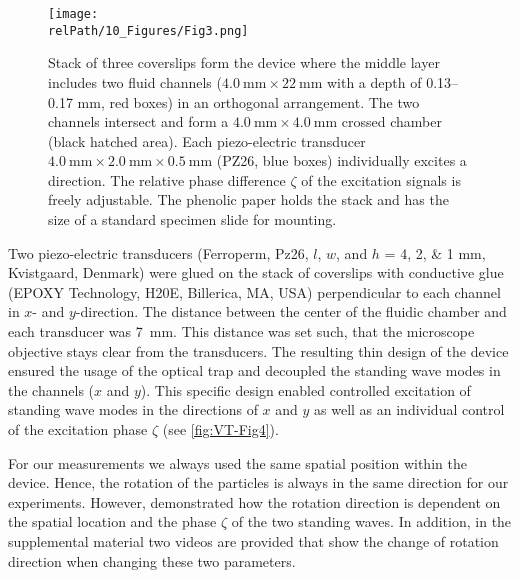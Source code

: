 \begin{figure}
    \centering
    \texttt{[image: \\relPath/10\_Figures/Fig3.png]}
    \caption{Stack of three coverslips form the device where the middle layer 
        includes two fluid channels ($\SI{4.0}{\mm}\times\SI{22}{\mm}$ with a 
        depth of \numrange{0.13}{0.17} \si{\milli\meter}, red boxes) in an 
        orthogonal arrangement. The two channels intersect and form a 
        $\SI{4.0}{\mm}\times\SI{4.0}{\mm}$ crossed chamber (black hatched 
        area).  Each piezo-electric transducer 
        $\SI{4.0}{\mm}\times\SI{2.0}{\mm}\times\SI{0.5}{\mm}$ (PZ26, blue 
        boxes) individually excites a direction.  The relative phase difference 
        $\zeta$ of the excitation signals is freely adjustable.  The phenolic 
        paper holds the stack and has the size of a standard specimen slide for 
    mounting.\label{fig:VT-Fig3}}
\end{figure}

Two piezo-electric transducers (Ferroperm, Pz26, $l$, $w$, and $h$ = \numlist{4; 
2; 1} \si{\mm}, Kvistgaard, Denmark) were glued on the stack of coverslips with 
conductive glue (EPOXY Technology, H20E, Billerica, MA, USA) perpendicular to 
each channel in $x$- and $y$-direction. The distance between the center of the 
fluidic chamber and each transducer was \SI{7}{\mm}. This distance was set such, 
that the microscope objective stays clear from the transducers. The resulting 
thin design of the device ensured the usage of the optical trap and decoupled 
the standing wave modes in the channels ($x$ and $y$). This specific design 
enabled controlled excitation of standing wave modes in the directions of $x$ 
and $y$ as well as an individual control of the excitation phase $\zeta$ (see 
\cref{fig:VT-Fig4}).

For our measurements we always used the same spatial position within the device.  
Hence, the rotation of the particles is always in the same direction for our 
experiments. However, \citeauthor{Lamprecht2015} \cite{Lamprecht2015} 
demonstrated how the rotation direction is dependent on the spatial location and 
the phase $\zeta$ of the two standing waves. In addition, in the supplemental 
material \cite{VT_supplemental} two videos are provided that show the change of 
rotation direction when changing these two parameters.

